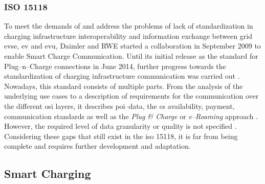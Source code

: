 \subsubsection{ISO 15118}
\label{ch:Fundamentals:sec:Electric Mobility:ssec:Relevant Standards:sssec:ISO 15118}

To meet the demands of  and address the problems of lack of standardization in charging infrastructure interoperability and information exchange between grid \acrshort{evse}, \acrshort{ev} and \acrshort{evu}, Daimler and RWE started a collaboration in September 2009 to enable Smart Charge Communication.
Until its initial release as the standard for Plug--n--Charge connections in June 2014, further progress towards the standardization of charging infrastructure communication was carried out \cite{heinrich_iso_2017}.
Nowadays, this standard consists of multiple parts. From the analysis of the underlying use cases to a description of requirements for the communication over the different \acrshort{osi} layers, it describes \acrshort{poi}--data, the \acrshort{cs} availability, payment, communication standards as well as the \textit{Plug \& Charge} or \textit{e--Roaming} approach \cite{brosi_methode_2019}. 
However, the required level of data granularity or quality is not specified \cite{linnemann_elektromobilitat_2020}. Considering these gaps that still exist in the \acrshort{iso} 15118, it is far from being complete and requires further development and adaptation.

\subsection{Smart Charging}
\label{ch:Fundamentals:sec:Electric Mobility:ssec:Smart Charging}

